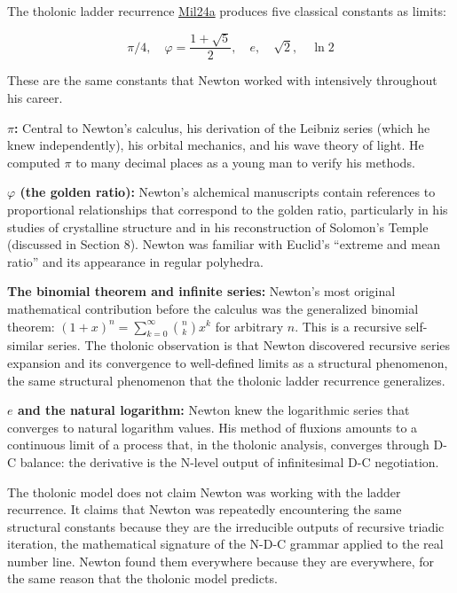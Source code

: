 \documentclass[
  11pt,
  letterpaper,
]{article}
\begin{document}
The tholonic ladder recurrence
\href{https://github.com/baardev/truevalue/blob/main/docnav/Research/papers/1_recursive-tholonic-five-constants/1_recursive-tholonic-five-constants.pdf}{Mil24a}
produces five classical constants as limits:

\[\pi/4, \quad \varphi = \frac{1 + \sqrt{5}}{2}, \quad e, \quad \sqrt{2}, \quad \ln 2\]

These are the same constants that Newton worked with intensively
throughout his career.

\textbf{\(\pi\):} Central to Newton's calculus, his derivation of the
Leibniz series (which he knew independently), his orbital mechanics, and
his wave theory of light. He computed \(\pi\) to many decimal places as
a young man to verify his methods.

\textbf{\(\varphi\) (the golden ratio):} Newton's alchemical manuscripts
contain references to proportional relationships that correspond to the
golden ratio, particularly in his studies of crystalline structure and
in his reconstruction of Solomon's Temple (discussed in Section 8).
Newton was familiar with Euclid's ``extreme and mean ratio'' and its
appearance in regular polyhedra.

\textbf{The binomial theorem and infinite series:} Newton's most
original mathematical contribution before the calculus was the
generalized binomial theorem:
\((1 + x)^n = \sum_{k=0}^{\infty} \binom{n}{k} x^k\) for arbitrary
\(n\). This is a recursive self-similar series. The tholonic observation
is that Newton discovered recursive series expansion and its convergence
to well-defined limits as a structural phenomenon, the same structural
phenomenon that the tholonic ladder recurrence generalizes.

\textbf{\(e\) and the natural logarithm:} Newton knew the logarithmic
series that converges to natural logarithm values. His method of
fluxions amounts to a continuous limit of a process that, in the
tholonic analysis, converges through D-C balance: the derivative is the
N-level output of infinitesimal D-C negotiation.

The tholonic model does not claim Newton was working with the ladder
recurrence. It claims that Newton was repeatedly encountering the same
structural constants because they are the irreducible outputs of
recursive triadic iteration, the mathematical signature of the N-D-C
grammar applied to the real number line. Newton found them everywhere
because they are everywhere, for the same reason that the tholonic model
predicts.
\end{document}
